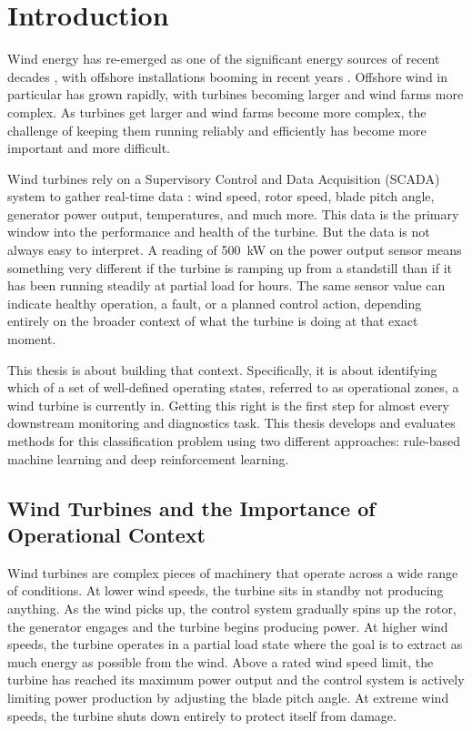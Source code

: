 \chapter{Introduction}
\label{chap:introduction}

Wind energy has re-emerged as one of the significant energy sources of recent
decades \citep{manwell2009}, with offshore installations booming in recent years
\citep{didier2022}. Offshore wind in particular has grown
rapidly, with turbines becoming larger and wind farms more complex. As turbines get larger and wind
farms become more complex, the challenge of keeping them running reliably and efficiently
has become more important and more difficult.

Wind turbines rely on a Supervisory Control and Data Acquisition (SCADA) system
to gather real-time data \citep{pandit2024}: wind speed, rotor speed, blade pitch
angle, generator power output, temperatures, and much more. This data is the primary
window into the performance and health of the turbine. But the data is not always easy
to interpret. A reading of 500~kW on the power output sensor means something very
different if the turbine is ramping up from a standstill than if it has been running
steadily at partial load for hours. The same sensor value can indicate healthy operation,
a fault, or a planned control action, depending entirely on the broader context of what
the turbine is doing at that exact moment.

This thesis is about building that context. Specifically, it is about identifying which
of a set of well-defined operating states, referred to as operational zones, a wind
turbine is currently in. Getting this right is the first step for almost every downstream
monitoring and diagnostics task. This thesis develops and evaluates methods for this
classification problem using two different approaches: rule-based machine learning and
deep reinforcement learning.

\section{Wind Turbines and the Importance of Operational Context}
\label{sec:intro:context}

Wind turbines are complex pieces of machinery that operate across a wide range of
conditions. At lower wind speeds, the turbine sits in standby not producing anything.
As the wind picks up, the control system gradually spins up the rotor, the generator
engages and the turbine begins producing power. At higher wind speeds, the turbine
operates in a partial load state where the goal is to extract as much energy as possible
from the wind. Above a rated wind speed limit, the turbine has reached its maximum power
output and the control system is actively limiting power production by adjusting the blade
pitch angle. At extreme wind speeds, the turbine shuts down entirely to protect itself
from damage.

